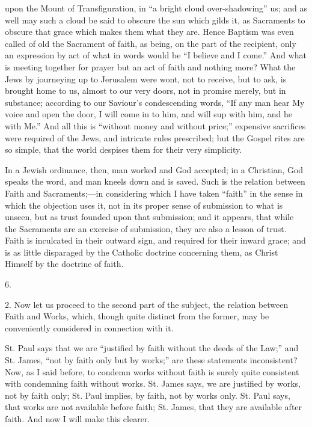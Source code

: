upon the Mount of Transfiguration, in ``a bright cloud
over-shadowing'' us; and as well may such a cloud be said to
obscure the sun which gilds it, as Sacraments to obscure that grace
which makes them what they are. Hence Baptism was even called of old
the Sacrament of faith, as being, on the part of the recipient, only
an expression by act of what in words would be ``I believe and I
come.'' And what is meeting together for prayer but an act of
faith and nothing more? What the Jews by journeying up to Jerusalem
were wont, not to receive, but to ask, is brought home to us, almost
to our very doors, not in promise merely, but in substance; according
to our Saviour's condescending words, ``If any man hear My voice
and open the door, I will come in to him, and will sup with him, and
he with Me.'' And all this is ``without money and without
price;'' expensive sacrifices were required of the Jews, and
intricate rules prescribed; but the Gospel rites are so simple, that
the world despises them for their very simplicity.

In a Jewish ordinance, then, man worked and God accepted; in
a Christian, God speaks the word, and man kneels down and is saved.
Such is the relation between Faith and Sacraments;—in considering
which I have taken ``faith'' in the sense in which the
objection uses it, not in its proper sense of submission to what is
unseen, but as trust founded upon that submission; and it appears,
that while the Sacraments are an exercise of submission, they are also
a lesson of trust. Faith is inculcated in their outward sign, and
required for their inward grace; and is as little disparaged by the
Catholic doctrine concerning them, as Christ Himself by the doctrine
of faith.

6.

2. Now let us proceed to the second part of the subject, the
relation between Faith and Works, which, though quite distinct from
the former, may be conveniently considered in connection with it.

St. Paul says that we are ``justified by faith without the
deeds of the Law;'' and St. James, ``not by faith only but by
works;'' are these statements inconsistent? Now, as I said
before, to condemn works without faith is surely quite consistent with
condemning faith without works. St. James says, we are justified by
works, not by faith only; St. Paul implies, by faith, not by works
only. St. Paul says, that works are not available before faith; St.
James, that they are available after faith. And now I will make this
clearer.

